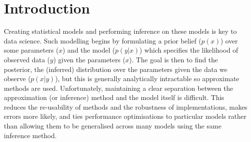 \documentclass[sigconf]{acmart}
\begin{document}



\maketitle

\section{Introduction}
\label{s:introduction}

Creating statistical models and performing inference on these models is key to data science. Such modelling begins by formulating a prior belief ($p(x)$) over some parameters ($x$) and the model ($p(y|x)$) which specifies the likelihood of observed data ($y$) given the parameters ($x$). The goal is then to find the posterior, the (inferred) distribution over the parameters given the data we observe ($p(x|y)$), but this is generally analytically intractable so approximate methods are used. Unfortunately, maintaining a clear separation between the approximation (or inference) method and the model itself is difficult. This reduces the re-usability of methods and the robustness of implementations, makes errors more likely, and ties performance optimisations to particular models rather than allowing them to be generalised across many models using the same inference method.
\end{document}
